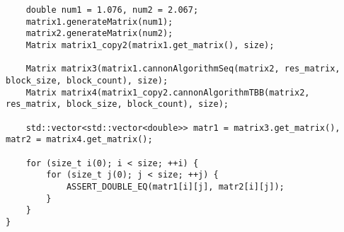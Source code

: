 \documentclass{report}
\begin{document}
\begin{lstlisting}
    double num1 = 1.076, num2 = 2.067;
    matrix1.generateMatrix(num1);
    matrix2.generateMatrix(num2);
    Matrix matrix1_copy2(matrix1.get_matrix(), size);

    Matrix matrix3(matrix1.cannonAlgorithmSeq(matrix2, res_matrix, block_size, block_count), size);
    Matrix matrix4(matrix1_copy2.cannonAlgorithmTBB(matrix2, res_matrix, block_size, block_count), size);

    std::vector<std::vector<double>> matr1 = matrix3.get_matrix(), matr2 = matrix4.get_matrix();

    for (size_t i(0); i < size; ++i) {
        for (size_t j(0); j < size; ++j) {
            ASSERT_DOUBLE_EQ(matr1[i][j], matr2[i][j]);
        }
    }
}
\end{lstlisting}
\end{document}
